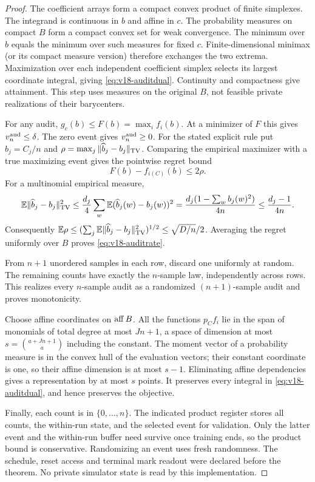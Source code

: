 \begin{proof}
The coefficient arrays form a compact convex product of finite simplexes.
The integrand is continuous in $b$ and affine in $c$. The probability
measures on compact $B$ form a compact convex set for weak convergence.
The minimum over $b$ equals the minimum over such measures for fixed $c$.
Finite-dimensional minimax (or its compact measure version) therefore
exchanges the two extrema. Maximization over each independent coefficient
simplex selects its largest coordinate integral, giving
\eqref{eq:v18-auditdual}. Continuity and compactness give attainment.
This step uses measures on the original $B$, not feasible private
realizations of their barycenters.

For any audit, $g_c(b)\le F(b)=\max_i f_i(b)$. At a minimizer of $F$ this
gives $v^{\rm aud}_n\le\delta$. The zero event gives $v^{\rm aud}_n\ge0$.
For the stated explicit rule put $\widehat b_j=C_j/n$ and
$\rho=\max_j\|\widehat b_j-b_j\|_{\rm TV}$. Comparing the empirical
maximizer with a true maximizing event gives the pointwise regret bound
\[
 F(b)-f_{i(C)}(b)\le2\rho.
\]
For a multinomial empirical measure,
\[
 \mathbb E\|\widehat b_j-b_j\|_{\rm TV}^2
 \le\frac{d_j}{4}\sum_w\mathbb E(\widehat b_j(w)-b_j(w))^2
 =\frac{d_j(1-\sum_wb_j(w)^2)}{4n}
 \le\frac{d_j-1}{4n}.
\]
Consequently $\mathbb E\rho\le(\sum_j\mathbb E\|\widehat b_j-b_j\|_{\rm TV}^2)^{1/2}
\le\sqrt{D/n}/2$. Averaging the regret uniformly over $B$ proves
\eqref{eq:v18-auditrate}.

From $n+1$ unordered samples in each row, discard one uniformly at random.
The remaining counts have exactly the $n$-sample law, independently across
rows. This realizes every $n$-sample audit as a randomized $(n+1)$-sample
audit and proves monotonicity.

Choose affine coordinates on $\operatorname{aff} B$. All the functions $p_C f_i$ lie
in the span of monomials of total degree at most $Jn+1$, a space of
dimension at most $s=\binom{a+Jn+1}{a}$ including the constant. The moment
vector of a probability measure is in the convex hull of the evaluation
vectors; their constant coordinate is one, so their affine dimension is
at most $s-1$. Eliminating affine dependencies gives a representation by
at most $s$ points. It preserves every integral in
\eqref{eq:v18-auditdual}, and hence preserves the objective.

Finally, each count is in $\{0,\ldots,n\}$. The indicated product register
stores all counts, the within-run state, and the selected event for
validation. Only the latter event and the within-run buffer need survive
once training ends, so the product bound is conservative. Randomizing an
event uses fresh randomness. The schedule, reset access and terminal mark
readout were declared before the theorem. No private simulator state is
read by this implementation.
\end{proof}

